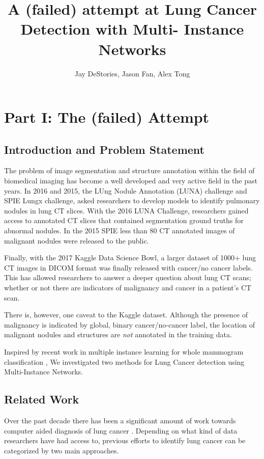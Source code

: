 \documentclass[twocolumn,10pt]{article}
\title{A (failed) attempt at Lung Cancer Detection with Multi-
Instance Networks}
\author{Jay DeStories, Jason Fan, Alex Tong}
\begin{document}
\maketitle

\section{Part I: The (failed) Attempt}
\subsection{Introduction and Problem Statement}
The problem of image segmentation and structure annotation within the 
field of biomedical imaging has become a well developed and very active field in
the past years. In 2016 and 2015, the LUng Nodule Annotation (LUNA) challenge and 
SPIE Lungx challenge, asked researchers to develop models to identify pulmonary 
nodules in lung CT slices. With the 2016 LUNA Challenge, researchers gained access
to annotated CT slices that contained segmentation ground truths for abnormal 
nodules. 
In the 2015 SPIE less than 80 CT annotated images of malignant nodules were 
released to the public.

Finally, with the 2017 Kaggle Data Science Bowl, a larger dataset of
1000+ lung CT images in DICOM format was finally released with cancer/no cancer 
labels. This has allowed researchers to answer a deeper question about lung CT
scans; whether or not there are indicators of malignancy and cancer in a patient's
CT scan.

There is, however, one caveat to the Kaggle dataset. 
Although the presence of malignancy is indicated by global, binary 
cancer/no-cancer label, the location of malignant nodules and structures are
\textit{not} annotated in the training data.

Inspired by recent work in multiple instance learning for 
whole mammogram classification
\cite{DBLP:journals/corr/ZhuLVX16},
We investigated two methods for Lung Cancer detection using Multi-Instance 
Networks.

\subsection{Related Work}
Over the past decade there has been a significant amount of work towards 
computer aided diagnosis of lung cancer \cite{cad_1998}. Depending on what kind
of data researchers have had access to, previous efforts to identify lung cancer
can be categorized by two main approaches. 
\end{document}
